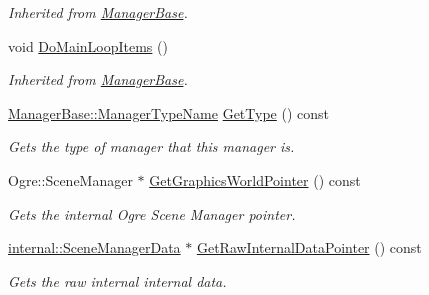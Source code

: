 \begin{DoxyCompactItemize}
\begin{DoxyCompactList}\small\item\em Inherited from \hyperlink{classphys_1_1ManagerBase}{ManagerBase}. \item\end{DoxyCompactList}\item 
\hypertarget{classphys_1_1SceneManager_a27a3f6b21e15f628642b1cad524f1a18}{
void \hyperlink{classphys_1_1SceneManager_a27a3f6b21e15f628642b1cad524f1a18}{DoMainLoopItems} ()}
\label{classphys_1_1SceneManager_a27a3f6b21e15f628642b1cad524f1a18}

\begin{DoxyCompactList}\small\item\em Inherited from \hyperlink{classphys_1_1ManagerBase}{ManagerBase}. \item\end{DoxyCompactList}\item 
\hyperlink{classphys_1_1ManagerBase_aaa6ccddf23892eaccb898529414f80a5}{ManagerBase::ManagerTypeName} \hyperlink{classphys_1_1SceneManager_af2b4f6bc50d40ffe06f6172c3d1dd02d}{GetType} () const 
\begin{DoxyCompactList}\small\item\em Gets the type of manager that this manager is. \item\end{DoxyCompactList}\item 
Ogre::SceneManager $\ast$ \hyperlink{classphys_1_1SceneManager_aa6bfec6329ecfb7c6196f488e1499c3c}{GetGraphicsWorldPointer} () const 
\begin{DoxyCompactList}\small\item\em Gets the internal Ogre Scene Manager pointer. \item\end{DoxyCompactList}\item 
\hyperlink{classphys_1_1internal_1_1SceneManagerData}{internal::SceneManagerData} $\ast$ \hyperlink{classphys_1_1SceneManager_a8f9073372374320723b7381f326f8753}{GetRawInternalDataPointer} () const 
\begin{DoxyCompactList}\small\item\em Gets the raw internal internal data. \item\end{DoxyCompactList}\end{DoxyCompactItemize}
